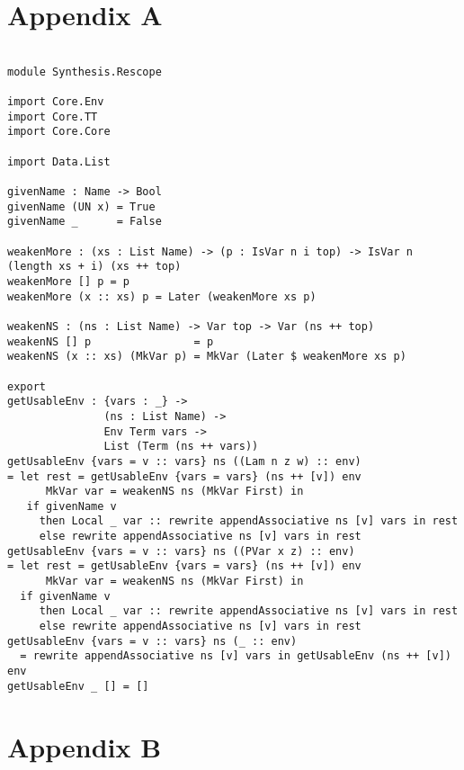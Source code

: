 \documentclass[a4paper]{article}
\begin{document}
\clearpage
\nocite{*}

\clearpage
\section{Appendix A}
\label{sec:org0a4c064}

\begin{center}
\begin{verbatim}

module Synthesis.Rescope 

import Core.Env
import Core.TT
import Core.Core

import Data.List

givenName : Name -> Bool
givenName (UN x) = True
givenName _      = False

weakenMore : (xs : List Name) -> (p : IsVar n i top) -> IsVar n (length xs + i) (xs ++ top)
weakenMore [] p = p
weakenMore (x :: xs) p = Later (weakenMore xs p)

weakenNS : (ns : List Name) -> Var top -> Var (ns ++ top)
weakenNS [] p                = p
weakenNS (x :: xs) (MkVar p) = MkVar (Later $ weakenMore xs p)

export
getUsableEnv : {vars : _} -> 
			   (ns : List Name) ->
			   Env Term vars ->
			   List (Term (ns ++ vars))
getUsableEnv {vars = v :: vars} ns ((Lam n z w) :: env) 
= let rest = getUsableEnv {vars = vars} (ns ++ [v]) env 
	  MkVar var = weakenNS ns (MkVar First) in
   if givenName v 
	 then Local _ var :: rewrite appendAssociative ns [v] vars in rest
	 else rewrite appendAssociative ns [v] vars in rest
getUsableEnv {vars = v :: vars} ns ((PVar x z) :: env) 
= let rest = getUsableEnv {vars = vars} (ns ++ [v]) env 
	  MkVar var = weakenNS ns (MkVar First) in
  if givenName v 
	 then Local _ var :: rewrite appendAssociative ns [v] vars in rest
	 else rewrite appendAssociative ns [v] vars in rest
getUsableEnv {vars = v :: vars} ns (_ :: env) 
  = rewrite appendAssociative ns [v] vars in getUsableEnv (ns ++ [v]) env
getUsableEnv _ [] = []

\end{verbatim}
\end{center}
\clearpage

\section{Appendix B}
\label{sec:orgfeb6878}
\end{document}
